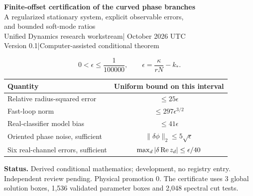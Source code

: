 \documentclass[11pt,a4paper]{article}
\begin{document}
\begin{center}
{\Large\bfseries Finite-offset certification of the curved phase branches}\\[8pt]
{\large A regularized stationary system, explicit observable errors,\\and bounded soft-mode ratios}\\[10pt]
Unified Dynamics research workstream\quad | October 2026 UTC\\
Version 0.1\quad |\quad Computer-assisted conditional theorem
\end{center}
\begin{abstract}
The prior curved-branch theorem established a local bifurcation without a numerical neighborhood radius. We regularize the full neutral stationary equations by factoring out their threshold powers. A 44-variable analytic system remains nonsingular at zero offset. Rigorous ball arithmetic certifies three analytic representative families over the closed regularized interval $0\le\epsilon\le10^{-5}$, corresponding to all 26 nonzero labeled branches for $0<\epsilon\le10^{-5}$. We bound amplitude error, fast-loop corrections and the bias of the six-real-loop classifier. Both oriented and real-channel error budgets now have explicit sufficient guarantees. Symmetry sectors and scaled Schur complements certify finite-offset radial and angular frequency brackets in the unit scalar dynamical normalization. These are constructor certificates under the unchanged candidate action, not independent review or physical validation.
\end{abstract}
\[
\boxed{0<\epsilon\le\frac1{100000},\qquad\epsilon=\frac\kappa{rN}-k_*.}
\]
\begin{center}\begin{tabular}{lrrr}
\toprule
Quantity & \multicolumn{3}{c}{Uniform bound on this interval}\\\midrule
Relative radius-squared error & \multicolumn{3}{c}{$\le25\epsilon$}\\
Fast-loop norm & \multicolumn{3}{c}{$\le297\epsilon^{3/2}$}\\
Real-classifier model bias & \multicolumn{3}{c}{$\le41\epsilon$}\\
Oriented phase noise, sufficient & \multicolumn{3}{c}{$\|\delta\phi\|_2\le5\sqrt\epsilon$}\\
Six real-channel errors, sufficient & \multicolumn{3}{c}{$\max_d|\delta\operatorname{Re} z_d|\le\epsilon/40$}\\\bottomrule
\end{tabular}\end{center}
\textbf{Status.} Derived conditional mathematics; development, no registry entry. Independent review pending. Physical promotion $0$. The certificate uses 3 global solution boxes, 1,536 validated parameter boxes and 2,048 spectral cut tests.
\end{document}
